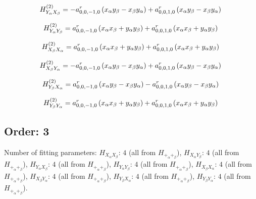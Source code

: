 \documentclass[fleqn]{article}
\begin{document}
\begin{dmath*}
H_{Y_{\alpha}X_{\beta}}^{(2)}=-  a^{r}_{0,0,-1,0} \left(x_{\alpha} y_{\beta} - x_{\beta} y_{\alpha}\right) +  a^{r}_{0,0,1,0} \left(x_{\alpha} y_{\beta} - x_{\beta} y_{\alpha}\right)\\
\end{dmath*}

\begin{dmath*}
H_{Y_{\alpha}Y_{\beta}}^{(2)}= a^{r}_{0,0,-1,0} \left(x_{\alpha} x_{\beta} + y_{\alpha} y_{\beta}\right) +  a^{r}_{0,0,1,0} \left(x_{\alpha} x_{\beta} + y_{\alpha} y_{\beta}\right)\\
\end{dmath*}

\begin{dmath*}
H_{X_{\beta}X_{\alpha}}^{(2)}=a^{r}_{0,0,-1,0} \left(x_{\alpha} x_{\beta} + y_{\alpha} y_{\beta}\right) + a^{r}_{0,0,1,0} \left(x_{\alpha} x_{\beta} + y_{\alpha} y_{\beta}\right)\\
\end{dmath*}

\begin{dmath*}
H_{X_{\beta}Y_{\alpha}}^{(2)}=-  a^{r}_{0,0,-1,0} \left(x_{\alpha} y_{\beta} - x_{\beta} y_{\alpha}\right) +  a^{r}_{0,0,1,0} \left(x_{\alpha} y_{\beta} - x_{\beta} y_{\alpha}\right)\\
\end{dmath*}

\begin{dmath*}
H_{Y_{\beta}X_{\alpha}}^{(2)}= a^{r}_{0,0,-1,0} \left(x_{\alpha} y_{\beta} - x_{\beta} y_{\alpha}\right) -  a^{r}_{0,0,1,0} \left(x_{\alpha} y_{\beta} - x_{\beta} y_{\alpha}\right)\\
\end{dmath*}

\begin{dmath*}
H_{Y_{\beta}Y_{\alpha}}^{(2)}= a^{r}_{0,0,-1,0} \left(x_{\alpha} x_{\beta} + y_{\alpha} y_{\beta}\right) +  a^{r}_{0,0,1,0} \left(x_{\alpha} x_{\beta} + y_{\alpha} y_{\beta}\right)\\
\end{dmath*}
\subsection{Order: 3}
Number of fitting parameters: $H_{X_{\alpha}X_{\beta}}$: $4$ (all from $H_{+_{\alpha}+_{\beta}}$), $H_{X_{\alpha}Y_{\beta}}$: $4$ (all from $H_{+_{\alpha}+_{\beta}}$), $H_{Y_{\alpha}X_{\beta}}$: $4$ (all from $H_{+_{\alpha}+_{\beta}}$), $H_{Y_{\alpha}Y_{\beta}}$: $4$ (all from $H_{+_{\alpha}+_{\beta}}$), $H_{X_{\beta}X_{\alpha}}$: $4$ (all from $H_{+_{\alpha}+_{\beta}}$), $H_{X_{\beta}Y_{\alpha}}$: $4$ (all from $H_{+_{\alpha}+_{\beta}}$), $H_{Y_{\beta}X_{\alpha}}$: $4$ (all from $H_{+_{\alpha}+_{\beta}}$), $H_{Y_{\beta}Y_{\alpha}}$: $4$ (all from $H_{+_{\alpha}+_{\beta}}$).
\end{document}
